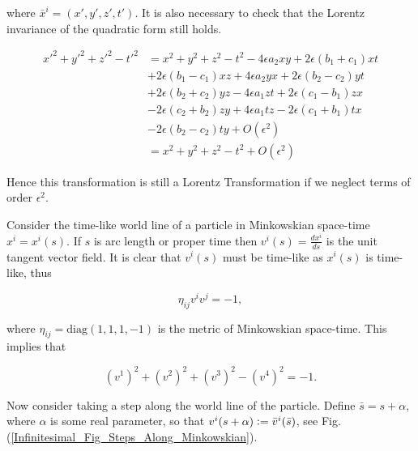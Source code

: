 \noindent where $\bar{x}^i = (x',y',z',t')$. It is also necessary to check that the Lorentz invariance of the quadratic form still holds. 

\begin{align*}
{x'}^2 + {y'}^2 + {z'}^2 - {t'}^2 & = x^2 + y^2 + z^2 - t^2 - 4\epsilon a_2 x y + 2 \epsilon(b_1 + c_1)xt \\
                                  & + 2\epsilon (b_1 - c_1)xz + 4 \epsilon a_2 yx + 2\epsilon (b_2 - c_2)yt \\
                                  & + 2 \epsilon (b_2 + c_2)yz - 4\epsilon a_1 zt + 2 \epsilon (c_1 - b_1)zx \\
                                  & -2 \epsilon (c_2 + b_2)zy + 4 \epsilon a_1 tz - 2 \epsilon (c_1 + b_1)tx \\
                                  & -2\epsilon (b_2 - c_2) ty + O(\epsilon^2) \\
                                  & = x^2 + y^2 + z^2 - t^2 + O(\epsilon^2)
\end{align*}

\noindent Hence this transformation is still a Lorentz Transformation if we neglect terms of order $\epsilon^2$.

Consider the time-like world line of a particle in Minkowskian space-time $x^i = x^i(s)$. If $s$ is arc length or proper time then $v^i(s) = \frac{dx^i}{ds}$ is the unit tangent vector field. It is clear that $v^i(s)$ must be time-like as $x^i(s)$ is time-like, thus

\begin{equation*}
\eta_{ij} v^i v^j = -1,
\end{equation*}

\noindent where $\eta_{ij} = \text{diag}(1,1,1,-1)$ is the metric of Minkowskian space-time. This implies that 

\begin{equation*}
(v^1)^2  + (v^2)^2 + (v^3)^2  - (v^4)^2 = -1.
\end{equation*}

Now consider taking a step along the world line of the particle. Define $\bar{s} = s + \alpha$, where $\alpha$ is some real parameter, so that $v^i (s+\alpha) \vcentcolon = \bar{v}^i(\bar{s})$, see Fig.(\ref{Infinitesimal_Fig_Steps_Along_Minkowskian}).

